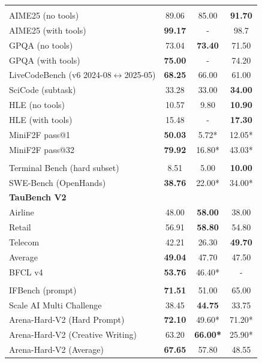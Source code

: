 \begin{table}[!htp]
\begin{tabular}{l|c c c }
\midrule
\rowcolor{black!5}
\multicolumn{4}{l}{\textbf{Reasoning}} \\
AIME25 (no tools) & 89.06 & 85.00 & \textbf{91.70} \\
AIME25 (with tools) & \textbf{99.17} & - & 98.7 \\
GPQA (no tools) &  73.04 & \textbf{73.40} & 71.50 \\
GPQA (with tools) & \textbf{75.00} & - & 74.20 \\
LiveCodeBench (v6 2024-08$\leftrightarrow$2025-05) & \textbf{68.25} & 66.00 & 61.00\\
SciCode (subtask) & 33.28 & 33.00 & \textbf{34.00}  \\
HLE (no tools) & 10.57 & 9.80 & \textbf{10.90} \\
HLE (with tools) & 15.48 & - & \textbf{17.30} \\
MiniF2F pass@1 & \textbf{50.03} & 5.72* & 12.05* \\
MiniF2F pass@32 & \textbf{79.92} & 16.80* & 43.03* \\
\midrule
\rowcolor{black!5}
\multicolumn{4}{l}{\textbf{Agentic}} \\
Terminal Bench (hard subset) & 8.51 & 5.00 & \textbf{10.00} \\
SWE-Bench (OpenHands) & \textbf{38.76} & 22.00* & 34.00* \\
\textbf{TauBench V2} &  &  &  \\
\quad Airline & 48.00 & \textbf{58.00} & 38.00 \\
\quad Retail & 56.91 & \textbf{58.80} & 54.80 \\
\quad Telecom & 42.21 & 26.30 & \textbf{49.70} \\
\quad Average & \textbf{49.04} & 47.70 & 47.50 \\
BFCL v4 & \textbf{53.76} & 46.40* & - \\
\midrule
\rowcolor{black!5}
\multicolumn{4}{l}{\textbf{Chat \& Instruction Following}} \\
IFBench (prompt) & \textbf{71.51} & 51.00 & 65.00 \\
Scale AI Multi Challenge & 38.45  & \textbf{44.75} & 33.75 \\
Arena-Hard-V2 (Hard Prompt) & \textbf{72.10} & 49.60* & 71.20* \\
Arena-Hard-V2 (Creative Writing) & 63.20 &  \textbf{66.00*} & 25.90* \\
Arena-Hard-V2 (Average) & \textbf{67.65} & 57.80 & 48.55 \\


\end{tabular}
\end{table}
